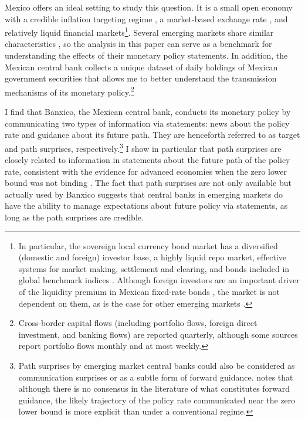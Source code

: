 \documentclass[a4paper, 12pt]{article}
\begin{document}
Mexico offers an ideal setting to study this question. It is a small open economy with a credible inflation targeting regime \parencite{DePooter_etal:2014,Beauregard_etal:2021}, a market-based exchange rate \parencite{IlzetzkiReinhartRogoff:2019}, and relatively liquid financial markets\footnote{In particular, the sovereign local currency bond market has a diversified (domestic and foreign) investor base, a highly liquid repo market, effective systems for market making, settlement and clearing, and bonds included in global benchmark indices \parencite{OECDsbo:2016}. Although foreign investors are an important driver of the liquidity premium in Mexican fixed-rate bonds \parencite{CFS:2021}, the market is not dependent on them, as is the case for other emerging markets \parencite[see Table A B.20 in][]{OECDsbo:2023}.}. 
Several emerging markets share similar characteristics \parencite{Ruch:2021,IlzetzkiReinhartRogoff:2019,OECDsbo:2020}, so the analysis in this paper can serve as a benchmark for understanding the effects of their monetary policy statements. In addition, the Mexican central bank collects a unique dataset of daily holdings of Mexican government securities that allows me to better understand the transmission mechanisms of its monetary policy.\footnote{Cross-border capital flows (including portfolio flows, foreign direct investment, and banking flows) are reported quarterly, although some sources report portfolio flows monthly and at most weekly.} 

I find that Banxico, the Mexican central bank, conducts its monetary policy by communicating two types of information via statements: news about the policy rate and guidance about its future path. 
They are henceforth referred to as target and path surprises, respectively.\footnote{Path surprises by emerging market central banks could also be considered as communication surprises or as a subtle form of forward guidance. \textcite{Kuttner:2018} notes that although there is no consensus in the literature of what constitutes forward guidance, the likely trajectory of the policy rate communicated near the zero lower bound is more explicit than under a conventional regime.} 
I show in particular that path surprises are closely related to information in statements about the future path of the policy rate, consistent with the evidence for advanced economies when the zero lower bound was not binding \parencite[e.g.,][]{GSS:2005a}. 
The fact that path surprises are not only available but actually used by Banxico suggests that central banks in emerging markets do have the ability to manage expectations about future policy via statements, as long as the path surprises are credible. 
\end{document}
